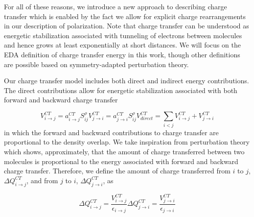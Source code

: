 \documentclass[journal=jctcce,manuscript=article]{achemso}
\begin{document}
For all of these reasons, we introduce a new approach to describing charge transfer
which is enabled by the fact we allow for explicit charge rearrangements in our
description of polarization. Note that charge transfer can be understood as energetic stabilization associated with tunneling of electrons between molecules and hence grows at least exponentially at short distances.\cite{misquitta2013charge} We will focus on the EDA definition of charge transfer energy in this work, though other definitions are possible based on symmetry-adapted perturbation theory.\cite{stone2009charge,misquitta2013charge}

Our charge transfer model includes both direct and
indirect energy contributions. The direct contributions allow for energetic stabilization
associated with both forward and backward charge transfer

\begin{subequations}
  \begin{equation}
  V^{CT}_{i\rightarrow j}=a_{i\rightarrow j}^{CT}S_{ij}^\rho
\end{equation}
\begin{equation}
  V^{CT}_{j\rightarrow i}=a_{j\rightarrow i}^{CT}S_{ij}^\rho
\end{equation}
\begin{equation}
  V^{CT}_{direct}=\sum_{i<j}V^{CT}_{i\rightarrow j}+V^{CT}_{j\rightarrow i}
\end{equation}
  \label{eq:ct_direct}
\end{subequations}
in which the forward and backward contributions to
charge transfer are proportional to the density overlap. We take inspiration from perturbation theory which shows, approximately, that
the amount of charge transferred between two molecules is proportional to the
energy associated with forward and backward charge transfer.\cite{khaliullin2007,khaliullin2008analysis,khaliullin2009electron}
Therefore, we define the amount of charge transferred from $i$ to $j$, $\Delta Q^{CT}_{i\rightarrow j}$,
and from $j$ to $i$, $\Delta Q^{CT}_{j\rightarrow i}$, as

\begin{subequations}
  \begin{equation}
  \Delta Q^{CT}_{i\rightarrow j}=\frac{V^{CT}_{i\rightarrow j}}{\epsilon_{i\rightarrow j}}
    \label{eq:ct_forward}
\end{equation}
\begin{equation}
  \Delta Q^{CT}_{j\rightarrow i}=\frac{V^{CT}_{j\rightarrow i}}{\epsilon_{j\rightarrow i}}
\end{equation}
\end{subequations}
\end{document}
